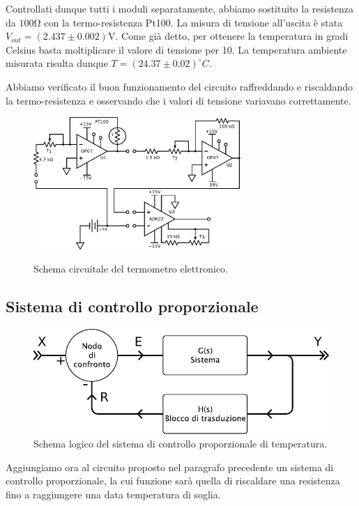 Controllati dunque tutti i moduli separatamente, abbiamo sostituito la resistenza da $100\si{\ohm}$ con la termo-resistenza Pt100.
La misura di tensione all'uscita è stata $V_{out}=(2.437\pm 0.002)\si{\volt}$.
Come già detto, per ottenere la temperatura in gradi Celsius basta moltiplicare il valore di tensione per 10.
La temperatura ambiente misurata risulta dunque $T=(24.37\pm0.02)^{\circ}C$.

Abbiamo verificato il buon funzionamento del circuito raffreddando e riscaldando la termo-resistenza e osservando che i valori di tensione variavano correttamente.

\begin{figure}[ht]
 \centering
   {\includegraphics[width=0.7\textwidth]{../E06/latex/c1.pdf}}
 \caption{Schema circuitale del termometro elettronico.}
 \label{cir6:term}
\end{figure}

\newpage

\subsection{Sistema di controllo proporzionale}

\begin{figure}
\centering
\includegraphics[width=.5\textwidth]{../E06/latex/s2.pdf}
\caption{Schema logico del sistema di controllo proporzionale di temperatura.}
\label{fig6:scheme2}
\end{figure}

Aggiungiamo ora al circuito proposto nel paragrafo precedente un sistema di controllo proporzionale, la cui funzione sarà quella di riscaldare una resistenza fino a raggiungere una data temperatura di soglia.

